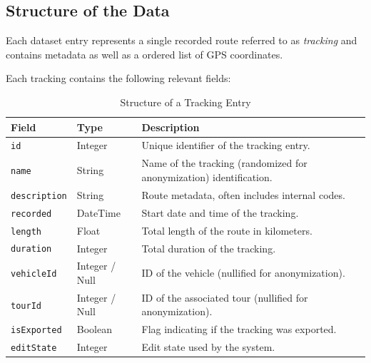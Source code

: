 \documentclass[a4paper,12pt,twoside]{scrreprt}
\begin{document}
\subsection{Structure of the Data}
Each dataset entry represents a single recorded route referred to as
\textit{tracking} and contains metadata as well as a ordered list of GPS
coordinates.

Each tracking contains the following relevant fields:
\begin{table}[H]
  \centering
  \begin{tabular}{|l|l|p{8cm}|}
    \hline
    \textbf{Field}       & \textbf{Type}  & \textbf{Description}
    \\
    \hline
    \texttt{id}          & Integer        & Unique identifier of the tracking
    entry.

    \\
    \hline
    \texttt{name}        & String         & Name of the tracking (randomized
    for anonymization)
    identification.
    \\
    \hline
    \texttt{description} & String         & Route metadata, often includes
    internal codes.
    \\
    \hline
    \texttt{recorded}    & DateTime       & Start date and time of the
    tracking.
    \\
    \hline
    \texttt{length}      & Float          & Total length of the route in
    kilometers.
    \\
    \hline
    \texttt{duration}    & Integer        & Total duration of the tracking.
    \\
    \hline
    \texttt{vehicleId}   & Integer / Null & ID of the vehicle (nullified for
    anonymization).
    \\
    \hline
    \texttt{tourId}      & Integer / Null & ID of the associated tour
    (nullified for anonymization).
    \\
    \hline
    \texttt{isExported}  & Boolean        & Flag indicating if the tracking was
    exported.
    \\
    \hline
    \texttt{editState}   & Integer        & Edit state used by the system.
    \\
    \hline
  \end{tabular}
  \label{tab:tracking_structure}
  \caption{Structure of a Tracking Entry}
\end{table}
\end{document}
